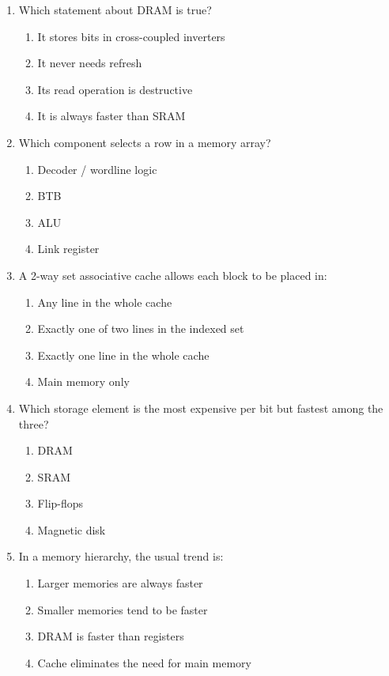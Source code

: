 \documentclass[11pt]{article}
\begin{document}
\begin{enumerate}[label=\textbf{A\arabic*.}]
  \item Which statement about DRAM is true?
  \begin{enumerate}[label=(\Alph*)]
    \item It stores bits in cross-coupled inverters
    \item It never needs refresh
    \item Its read operation is destructive
    \item It is always faster than SRAM
  \end{enumerate}

  \item Which component selects a row in a memory array?
  \begin{enumerate}[label=(\Alph*)]
    \item Decoder / wordline logic
    \item BTB
    \item ALU
    \item Link register
  \end{enumerate}

  \item A 2-way set associative cache allows each block to be placed in:
  \begin{enumerate}[label=(\Alph*)]
    \item Any line in the whole cache
    \item Exactly one of two lines in the indexed set
    \item Exactly one line in the whole cache
    \item Main memory only
  \end{enumerate}

  \item Which storage element is the most expensive per bit but fastest among the three?
  \begin{enumerate}[label=(\Alph*)]
    \item DRAM
    \item SRAM
    \item Flip-flops
    \item Magnetic disk
  \end{enumerate}

  \item In a memory hierarchy, the usual trend is:
  \begin{enumerate}[label=(\Alph*)]
    \item Larger memories are always faster
    \item Smaller memories tend to be faster
    \item DRAM is faster than registers
    \item Cache eliminates the need for main memory
  \end{enumerate}
\end{enumerate}
\end{document}

